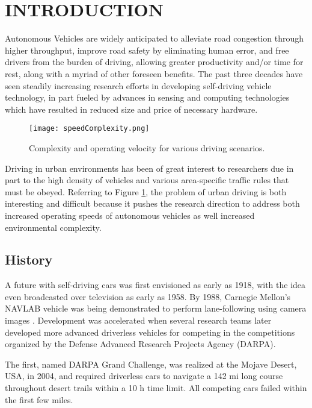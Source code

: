 \section{INTRODUCTION}

Autonomous Vehicles are widely anticipated to alleviate road congestion through
higher throughput, improve road safety by eliminating human error, and free
drivers from the burden of driving, allowing greater productivity and/or time
for rest, along with a myriad of other foreseen benefits. The past three decades
have seen steadily increasing research efforts in developing self-driving
vehicle technology, in part fueled by advances in sensing and computing
technologies which have resulted in reduced size and price of necessary
hardware.

\begin{figure}[h]
    \centering
    \texttt{[image: speedComplexity.png]}
    \caption{Complexity and operating velocity for various driving scenarios.}
    \label{fig:speedComplexity}
\end{figure}

Driving in urban environments has been of great interest to researchers due in
part to the high density of vehicles and various area-specific traffic rules
that must be obeyed. Referring to Figure \ref{fig:speedComplexity}, the problem
of urban driving is both interesting and difficult because it pushes the
research direction to address both increased operating speeds of autonomous
vehicles as well increased environmental complexity.

\subsection{History}

A future with self-driving cars was first envisioned as early as 1918, with the
idea even broadcasted over television as early as 1958. By 1988, Carnegie
Mellon’s NAVLAB vehicle was being demonstrated to perform lane-following using
camera images \cite{navlab}. Development was accelerated when several research
teams later developed more advanced driverless vehicles for competing in the
competitions organized by the Defense Advanced Research Projects Agency (DARPA).

The first, named DARPA Grand Challenge, was realized at the Mojave Desert, USA,
in 2004, and required driverless cars to navigate a 142 mi long course
throughout desert trails within a 10 h time limit. All competing cars failed
within the first few miles.

